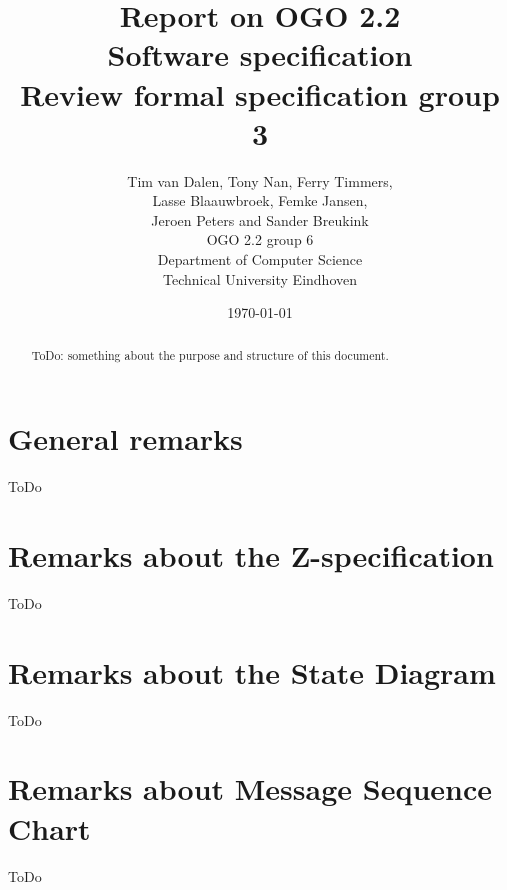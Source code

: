 \documentclass[a4paper,11pt]{article}
\title{Report on OGO 2.2 \\ Software specification\\ Review formal specification group 3}
\author{
        Tim van Dalen, Tony Nan, Ferry Timmers, \\ Lasse Blaauwbroek, Femke Jansen, \\Jeroen Peters and Sander Breukink\\ OGO 2.2 group 6 \\
                Department of Computer Science\\
        Technical University Eindhoven\\
}
\date{\today}
\begin{document}
\maketitle

\begin{abstract}
ToDo: something about the purpose and structure of this document.
\end{abstract}

\newpage
	
	\tableofcontents
	\newpage
	
	\section{General remarks}
    ToDo
	
	\section{Remarks about the Z-specification}
    ToDo

	\section{Remarks about the State Diagram}
    ToDo

    \section{Remarks about Message Sequence Chart}
    ToDo
\end{document}
